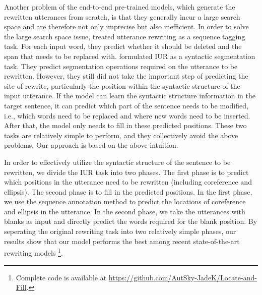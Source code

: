 Another problem of the end-to-end pre-trained models, which generate the rewritten utterances from scratch,
is that they generally incur a large search space and 
are therefore not only imprecise but also inefficient.
In order to solve the large search space issue, %
\citet{hao-etal-2021-rast} treated utterance rewriting as 
a sequence tagging task. For each input word, they predict whether 
it should be deleted and the span that needs to be replaced with. 
\citet{liu-etal-2020-incomplete} formulated IUR as a syntactic segmentation task. They predict segmentation operations required on the utterance to be rewritten. However, they still did not take the important step of predicting the 
site of rewrite, particularly the position within the syntactic structure of
the input utterance. If the model can learn the syntactic structure 
information in the target sentence, it can predict which part of the 
sentence needs to be modified, i.e., which words need to be replaced and 
where new words need to be inserted. 
After that, the model only needs to fill in these predicted positions. 
These two tasks are relatively simple to perform, and they collectively
avoid the above problems.
Our approach is based on the above intuition.

In order to effectively utilize the syntactic structure of the sentence to be rewritten, we divide the IUR task into two phases. The first phase is to predict which positions in the utterance need to be rewritten (including coreference and ellipsis). The second phase is to fill in the predicted positions. In the first phase, we use the sequence annotation method to predict the locations of coreference and ellipsis in the utterance. In the second phase, we take the 
utterances with blanks as input
and directly predict the words required for the blank position.
By seperating the
original rewriting
task into two relatively simple phases, 
our results show that 
our model performs the best among 
recent state-of-the-art
rewriting models \footnote{Complete code is available at
\url{https://github.com/AutSky-JadeK/Locate-and-Fill}.}. 

